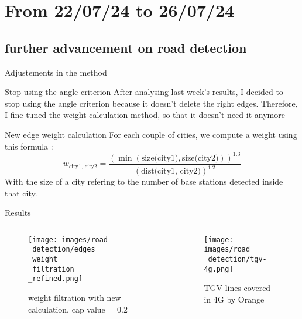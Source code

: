 \smallframetitle

\section{From 22/07/24 to 26/07/24}
\insertsectionframe

\subsection{further advancement on road detection}
\insertsubsectionframe

\begin{frame}{Adjustements in the method}
    \begin{block}{Stop using the angle criterion}
        After analysing last week's results, I decided to stop using the angle criterion because it doesn't delete the right edges.
        Therefore, I fine-tuned the weight calculation method, so that it doesn't need it anymore
    \end{block}
    \begin{block}{New edge weight calculation}
        For each couple of cities, we compute a weight using this formula :
        $$w_{\text{city1, city2}} = \frac{(\min(\text{size(city1)},\text{size(city2)}))^{1.3}}{(\text{dist(city1, city2)})^{1.2}}$$
        With the size of a city refering to the number of base stations detected inside that city.
    \end{block}
\end{frame}

\begin{frame}{Results}
    \begin{columns}
        \begin{column}{0.5\textwidth}
            \begin{figure}
                \texttt{[image: images/road\\\_detection/edges\\\_weight\\\_filtration\\\_refined.png]}
                \caption{weight filtration with new calculation, cap value = $0.2$}
            \end{figure}
        \end{column}
        \begin{column}{0.5\textwidth}
            \begin{figure}
                \texttt{[image: images/road\\\_detection/tgv-4g.png]}
                \caption{TGV lines covered in 4G by Orange}
            \end{figure}
        \end{column}
    \end{columns}        
\end{frame}

